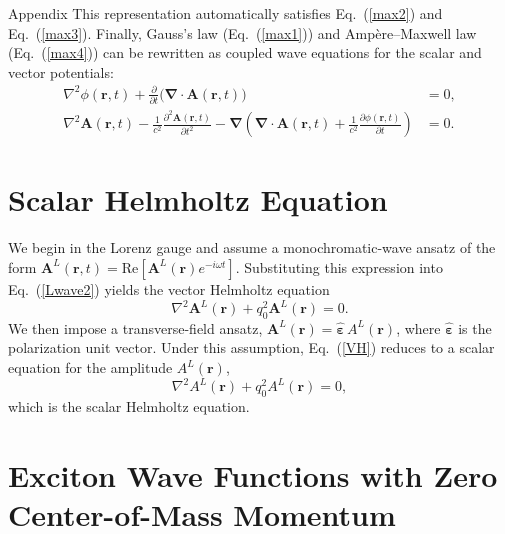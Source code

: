 \begin{Appx}{Appendix}
This representation automatically satisfies Eq.~(\ref{max2}) and Eq.~(\ref{max3}). Finally, Gauss's law (Eq.~(\ref{max1})) and Ampère–Maxwell law (Eq.~(\ref{max4})) can be rewritten as coupled wave equations for the scalar and vector potentials:
\begin{align}
\nabla^2 \phi(\boldsymbol{r}, t)
+
\frac{\partial}{\partial t}\big(\boldsymbol{\nabla}\cdot\boldsymbol{A}(\boldsymbol{r}, t)\big)
&= 0,
\\
\nabla^2 \boldsymbol{A}(\boldsymbol{r}, t)
-
\frac{1}{c^2}\frac{\partial^2 \boldsymbol{A}(\boldsymbol{r}, t)}{\partial t^2}
-
\boldsymbol{\nabla}\!\left(
\boldsymbol{\nabla}\cdot\boldsymbol{A}(\boldsymbol{r}, t)
+
\frac{1}{c^2}\frac{\partial \phi(\boldsymbol{r}, t)}{\partial t}
\right)
&= 0.
\end{align}



\section{Scalar Helmholtz Equation}
\label{ch:SHE}

We begin in the Lorenz gauge and assume a monochromatic-wave ansatz of the form
$\boldsymbol{A}^{L}(\boldsymbol{r},t)=\mathrm{Re}\!\left[\boldsymbol{A}^{L}(\boldsymbol{r})e^{-i\omega t}\right]$.
Substituting this expression into Eq.~(\ref{Lwave2}) yields the vector Helmholtz equation
\begin{equation}
\nabla^{2}\boldsymbol{A}^{L}(\boldsymbol{r})
+
q_{0}^{2}\boldsymbol{A}^{L}(\boldsymbol{r})
=0.
\label{VH}
\end{equation}
We then impose a transverse-field ansatz,
$\boldsymbol{A}^{L}(\boldsymbol{r})=\hat{\boldsymbol{\varepsilon}}\,A^{L}(\boldsymbol{r})$,
where $\hat{\boldsymbol{\varepsilon}}$ is the polarization unit vector. Under this assumption, Eq.~(\ref{VH}) reduces to a scalar equation for the amplitude $A^{L}(\boldsymbol{r})$,
\begin{equation}
\nabla^{2}A^{L}(\boldsymbol{r}) + q_{0}^{2}A^{L}(\boldsymbol{r}) = 0,
\end{equation}
which is the scalar Helmholtz equation.



\section{Exciton Wave Functions with Zero Center-of-Mass Momentum}
\label{ch:ZERO}


\end{Appx}
